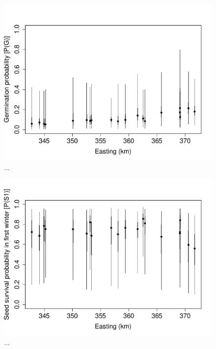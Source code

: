 \documentclass[12pt, oneside, titlepage]{article}   	%
\begin{document}
 \begin{figure}[h]
   \centering
       \includegraphics[page=1,width=1\textwidth]{../figures/spatial-g1.pdf}  
    \caption{ ... }
 \label{fig:test}
\end{figure}

 \begin{figure}[h]
   \centering
       \includegraphics[page=1,width=1\textwidth]{../figures/spatial-s1.pdf}  
    \caption{ ... }
 \label{fig:test}
\end{figure}
\end{document}
